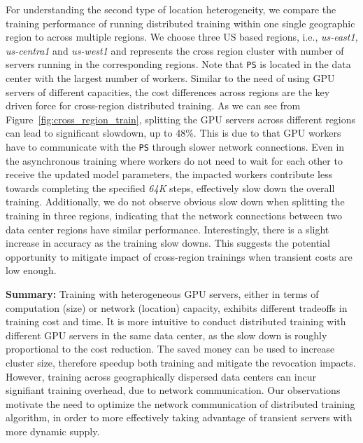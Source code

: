  
For understanding the second type of location heterogeneity, we compare the training performance of running distributed training within one single geographic region to across multiple regions. 
 We choose three US based regions, i.e., \emph{us-east1}, \emph{us-centra1} and \emph{us-west1} and represents the cross region cluster with number of servers running in the corresponding regions.  Note that \texttt{PS} is located in the data center with the largest number of workers. Similar to the need of using GPU servers of different capacities, the cost differences across regions are the key driven force for cross-region distributed training. As we can see from Figure~\ref{fig:cross_region_train}, splitting the GPU servers across different regions can lead to significant slowdown, up to 48\%. This is due to that GPU workers have to communicate with the \texttt{PS} through slower network connections. Even in the asynchronous training where workers do not need to wait for each other to receive the updated model parameters, the impacted workers contribute less towards completing the specified \emph{64K} steps, effectively slow down the overall training. Additionally, we do not observe obvious slow down when splitting the training in three regions, indicating that the network connections between two data center regions have similar performance. Interestingly, there is a slight increase in accuracy as the training slow downs. This suggests the potential opportunity to mitigate impact of cross-region trainings when transient costs are low enough. 


\textbf{Summary:} Training with heterogeneous GPU servers, either in terms of computation (size) or network (location) capacity, 
exhibits different tradeoffs in training cost and time. It is more intuitive to conduct distributed training with different GPU servers in the same data center, as the slow down is roughly proportional to the cost reduction. 
The saved money can be used to increase cluster size, therefore speedup both training and mitigate the revocation impacts. 
However, training across geographically dispersed data centers can incur signifiant training overhead, due to network communication. 
Our observations motivate the need to optimize the network communication of distributed training algorithm, in order to more effectively taking advantage of transient servers
with more dynamic supply.  






